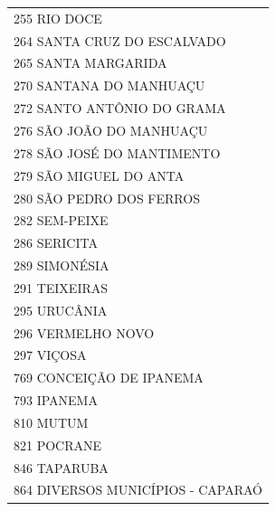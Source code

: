 \documentclass{article}
\begin{document}
\begin{longtable}[c]{m{18cm}}
\multicolumn{1}{l}{ \hspace{2em} 255 RIO DOCE } \\
\multicolumn{1}{l}{ \hspace{2em} 264 SANTA CRUZ DO ESCALVADO } \\
\multicolumn{1}{l}{ \hspace{2em} 265 SANTA MARGARIDA } \\
\multicolumn{1}{l}{ \hspace{2em} 270 SANTANA DO MANHUAÇU } \\
\multicolumn{1}{l}{ \hspace{2em} 272 SANTO ANTÔNIO DO GRAMA } \\
\multicolumn{1}{l}{ \hspace{2em} 276 SÃO JOÃO DO MANHUAÇU } \\
\multicolumn{1}{l}{ \hspace{2em} 278 SÃO JOSÉ DO MANTIMENTO } \\
\multicolumn{1}{l}{ \hspace{2em} 279 SÃO MIGUEL DO ANTA } \\
\multicolumn{1}{l}{ \hspace{2em} 280 SÃO PEDRO DOS FERROS } \\
\multicolumn{1}{l}{ \hspace{2em} 282 SEM-PEIXE } \\
\multicolumn{1}{l}{ \hspace{2em} 286 SERICITA } \\
\multicolumn{1}{l}{ \hspace{2em} 289 SIMONÉSIA } \\
\multicolumn{1}{l}{ \hspace{2em} 291 TEIXEIRAS } \\
\multicolumn{1}{l}{ \hspace{2em} 295 URUCÂNIA } \\
\multicolumn{1}{l}{ \hspace{2em} 296 VERMELHO NOVO } \\
\multicolumn{1}{l}{ \hspace{2em} 297 VIÇOSA } \\
\multicolumn{1}{l}{ \hspace{2em} 769 CONCEIÇÃO DE IPANEMA } \\
\multicolumn{1}{l}{ \hspace{2em} 793 IPANEMA } \\
\multicolumn{1}{l}{ \hspace{2em} 810 MUTUM } \\
\multicolumn{1}{l}{ \hspace{2em} 821 POCRANE } \\
\multicolumn{1}{l}{ \hspace{2em} 846 TAPARUBA } \\
\multicolumn{1}{l}{ \hspace{2em} 864 DIVERSOS MUNICÍPIOS - CAPARAÓ } \\
\end{longtable}
\end{document}
